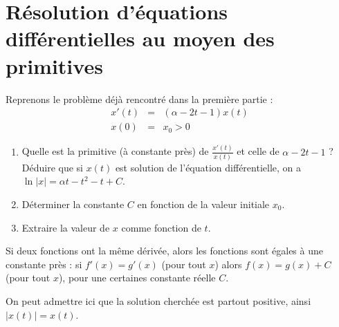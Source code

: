 \documentclass[11pt,class=report,crop=false]{standalone}
\begin{document}

\section*{Résolution d'équations différentielles au moyen des primitives}


\exercice{}
\enonce
Reprenons le problème déjà rencontré dans la première partie :
 \begin{eqnarray}
            x'(t) & = & (\alpha - 2t -1)x(t) \label{ncdiffx} \\
            x(0)  & = & x_0 > 0 \label{cix}
        \end{eqnarray}

\begin{enumerate}
\item Quelle est la primitive (à constante près) de $\frac{x'(t)}{x(t)}$ et celle de $\alpha -2t -1$ ? Déduire que si $x(t)$ est solution de l'équation différentielle,
on a $\ln| x| = \alpha t - t^2 -t + C$.
\item Déterminer la constante $C$ en fonction de la valeur initiale $x_0$.
\item Extraire la valeur de $x$ comme fonction de $t$.
\end{enumerate}
\finenonce

\indication
Si deux fonctions ont la même dérivée, alors les fonctions sont égales à une constante près :
si $f'(x)=g'(x)$ (pour tout $x$) alors $f(x)=g(x)+C$ (pour tout $x$), pour une certaines constante réelle $C$.

On peut admettre ici que la solution cherchée est partout positive, ainsi $|x(t)|=x(t)$.
\finindication

\correction

\end{document}
